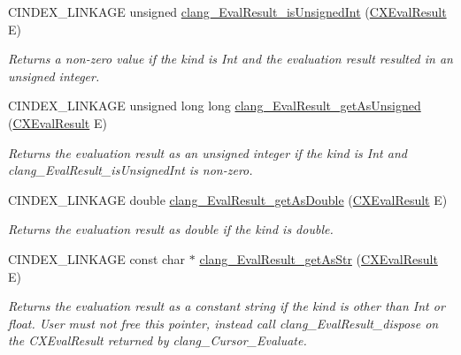 \begin{DoxyCompactItemize}
\mbox{\label{group__CINDEX__MISC_gad72ab38051388e5ed607ce5ce890b2ac}} 
C\+I\+N\+D\+E\+X\+\_\+\+L\+I\+N\+K\+A\+GE unsigned \hyperlink{group__CINDEX__MISC_gad72ab38051388e5ed607ce5ce890b2ac}{clang\+\_\+\+Eval\+Result\+\_\+is\+Unsigned\+Int} (\hyperlink{group__CINDEX__MISC_gaa9270afc68877e1f3b20ce5b343191bc}{C\+X\+Eval\+Result} E)
\begin{DoxyCompactList}\small\item\em Returns a non-\/zero value if the kind is Int and the evaluation result resulted in an unsigned integer. \end{DoxyCompactList}\item 
\mbox{\label{group__CINDEX__MISC_ga448569d83b25514da4a15e6623d4bf4e}} 
C\+I\+N\+D\+E\+X\+\_\+\+L\+I\+N\+K\+A\+GE unsigned long long \hyperlink{group__CINDEX__MISC_ga448569d83b25514da4a15e6623d4bf4e}{clang\+\_\+\+Eval\+Result\+\_\+get\+As\+Unsigned} (\hyperlink{group__CINDEX__MISC_gaa9270afc68877e1f3b20ce5b343191bc}{C\+X\+Eval\+Result} E)
\begin{DoxyCompactList}\small\item\em Returns the evaluation result as an unsigned integer if the kind is Int and clang\+\_\+\+Eval\+Result\+\_\+is\+Unsigned\+Int is non-\/zero. \end{DoxyCompactList}\item 
\mbox{\label{group__CINDEX__MISC_ga6d140616208f61e24e18abf806aa68a7}} 
C\+I\+N\+D\+E\+X\+\_\+\+L\+I\+N\+K\+A\+GE double \hyperlink{group__CINDEX__MISC_ga6d140616208f61e24e18abf806aa68a7}{clang\+\_\+\+Eval\+Result\+\_\+get\+As\+Double} (\hyperlink{group__CINDEX__MISC_gaa9270afc68877e1f3b20ce5b343191bc}{C\+X\+Eval\+Result} E)
\begin{DoxyCompactList}\small\item\em Returns the evaluation result as double if the kind is double. \end{DoxyCompactList}\item 
\mbox{\label{group__CINDEX__MISC_ga4ee614153e0a52b470b864d3840fe7be}} 
C\+I\+N\+D\+E\+X\+\_\+\+L\+I\+N\+K\+A\+GE const char $\ast$ \hyperlink{group__CINDEX__MISC_ga4ee614153e0a52b470b864d3840fe7be}{clang\+\_\+\+Eval\+Result\+\_\+get\+As\+Str} (\hyperlink{group__CINDEX__MISC_gaa9270afc68877e1f3b20ce5b343191bc}{C\+X\+Eval\+Result} E)
\begin{DoxyCompactList}\small\item\em Returns the evaluation result as a constant string if the kind is other than Int or float. User must not free this pointer, instead call clang\+\_\+\+Eval\+Result\+\_\+dispose on the C\+X\+Eval\+Result returned by clang\+\_\+\+Cursor\+\_\+\+Evaluate. \end{DoxyCompactList}\item 

\end{DoxyCompactItemize}
